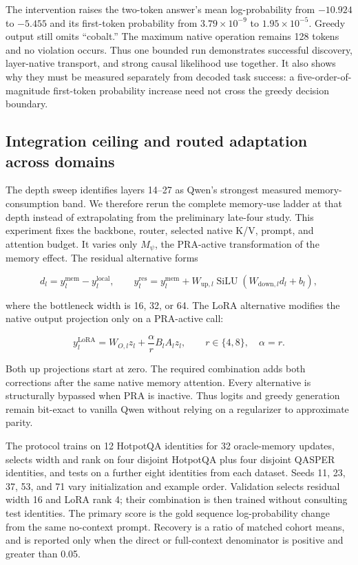 \documentclass[11pt]{article}
\begin{document}
The intervention raises the two-token answer's mean log-probability from $-10.924$ to $-5.455$
and its first-token probability from $3.79\times10^{-9}$ to $1.95\times10^{-5}$. Greedy output
still omits ``cobalt.'' The maximum native operation remains 128 tokens and no violation occurs.
Thus one bounded run demonstrates successful discovery, layer-native transport, and strong causal
likelihood use together. It also shows why they must be measured separately from decoded task
success: a five-order-of-magnitude first-token probability increase need not cross the greedy
decision boundary.

\subsection{Integration ceiling and routed adaptation across domains}
\label{sec:last14-convergence}

The depth sweep identifies layers 14--27 as Qwen's strongest measured memory-consumption band.
We therefore rerun the complete memory-use ladder at that depth instead of extrapolating from
the preliminary late-four study. This experiment fixes the backbone, router, selected native
K/V, prompt, and attention budget. It varies only $M_\psi$, the PRA-active transformation of
the memory effect. The residual alternative forms

\begin{equation}
d_l=y_l^{\mathrm{mem}}-y_l^{\mathrm{local}}, \qquad
y_l^{\mathrm{res}}=y_l^{\mathrm{mem}}+
W_{\mathrm{up},l}\operatorname{SiLU}(W_{\mathrm{down},l}d_l+b_l),
\label{eq:last14-residual}
\end{equation}

where the bottleneck width is 16, 32, or 64. The LoRA alternative modifies the native output
projection only on a PRA-active call:

\begin{equation}
y_l^{\mathrm{LoRA}}=W_{O,l}z_l+\frac{\alpha}{r}B_lA_lz_l,
\qquad r\in\{4,8\},\quad \alpha=r.
\label{eq:last14-lora}
\end{equation}

Both up projections start at zero. The required combination adds both corrections after the
same native memory attention. Every alternative is structurally bypassed when PRA is inactive.
Thus logits and greedy generation remain bit-exact to vanilla Qwen without relying on a
regularizer to approximate parity.

The protocol trains on 12 HotpotQA identities for 32 oracle-memory updates, selects width and
rank on four disjoint HotpotQA plus four disjoint QASPER identities, and tests on a further eight
identities from each dataset. Seeds 11, 23, 37, 53, and 71 vary initialization and example order.
Validation selects residual width 16 and LoRA rank 4; their combination is then trained without
consulting test identities. The primary score is the gold sequence log-probability change from
the same no-context prompt. Recovery is a ratio of matched cohort means, and is reported only
when the direct or full-context denominator is positive and greater than 0.05.
\end{document}
